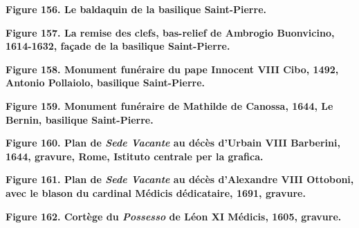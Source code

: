 \documentclass[12pt,twoside,openany]{book}
\begin{document}
\begin{center}
\par\small \textbf{Figure 156. Le baldaquin de la basilique Saint-Pierre.}
\end{center}

\begin{center}
\par\small \textbf{Figure 157. La remise des clefs, bas-relief de Ambrogio Buonvicino, 1614-1632, façade de la basilique Saint-Pierre.}
\end{center}

\begin{center}
\par\small \textbf{Figure 158. Monument funéraire du pape Innocent VIII Cibo, 1492, Antonio Pollaiolo, basilique Saint-Pierre.}
\end{center}

\begin{center}
\par\small \textbf{Figure 159. Monument funéraire de Mathilde de Canossa, 1644, Le Bernin, basilique Saint-Pierre.}
\end{center}

\begin{center}
\par\small \textbf{Figure 160. Plan de \textit{Sede Vacante} au décès d’Urbain VIII Barberini, 1644, gravure, Rome, Istituto centrale per la grafica.}
\end{center}

\begin{center}
\par\small \textbf{Figure 161. Plan de \textit{Sede Vacante} au décès d’Alexandre VIII Ottoboni, avec le blason du cardinal Médicis dédicataire, 1691, gravure.}
\end{center}

\begin{center}
\par\small \textbf{Figure 162. Cortège du \textit{Possesso} de Léon XI Médicis, 1605, gravure.}
\end{center}
\end{document}

